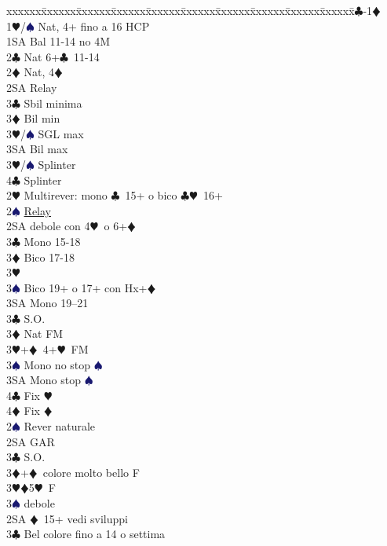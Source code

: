\documentclass[a4paper,italian]{article}
\newcommand{\BC}{\textcolor{OliveGreen}{$\clubsuit$}}
\newcommand{\BD}{\textcolor{RedOrange}{$\vardiamondsuit$}}
\newcommand{\BH}{\textcolor{Red2}{$\varheartsuit${}}}
\newcommand{\BS}{\textcolor{MidnightBlue}{$\spadesuit${}}}
\newenvironment{bidtable}
{\begin{tabbing}

    xxxxxx\=xxxxxx\=xxxxxx\=xxxxxx\=xxxxxx\=xxxxxx\=xxxxxx\=xxxxxx\=xxxxxx\=xxxxxx\=\kill}
{\end{tabbing} }%
\begin{document}
\begin{multicols}{2}
    \begin{bidtable}
        1\BC-1\BD\+\\
        1\BH/\BS \> Nat, 4+ fino a 16 HCP\\
        1SA \> Bal 11-14 no 4M\\
        2\BC \> Nat 6+\BC\ 11-14\\
        2\BD \> Nat, 4\BD \+\\
        2SA \> Relay\+\\
        3\BC \> Sbil minima\\
        3\BD \> Bil min\\
        3\BH/\BS \> SGL max\\
        3SA \> Bil max\-\\
        3\BH/\BS \> Splinter\\
        4\BC \> Splinter\-\\
        2\BH \> Multirever: mono \BC\ 15+ o bico \BC \BH\ 16+\+\\
        2\BS \> \hyperref[multirever]{Relay}\\
        2SA \> debole con 4\BH\ o 6+\BD \+\\
        3\BC \> Mono 15-18\\
        3\BD \> Bico 17-18\\
        3\BH {}\\
        3\BS \> Bico 19+ o 17+ con Hx+\BD\\
        3SA \> Mono 19--21\-\\
        3\BC \> S.O.\\
        3\BD \> Nat FM\\
        3\BH {}+\BD\ 4+\BH\ FM\+\\
        3\BS \> Mono no stop \BS \\
        3SA \> Mono stop \BS \\
        4\BC \> Fix \BH \\
        4\BD \> Fix \BD \-\-\\
        2\BS \> Rever naturale\+\\
        2SA \> GAR\\
        3\BC \> S.O.\\
        3\BD {}+\BD\ colore molto bello F\\
        3\BH {}\BD 5\BH\ F\\
        3\BS \> debole\-\\
        2SA \BD\ 15+ vedi sviluppi\\
        3\BC \> Bel colore fino a 14 o settima\+\\

\end{bidtable}
\end{multicols}
\end{document}

